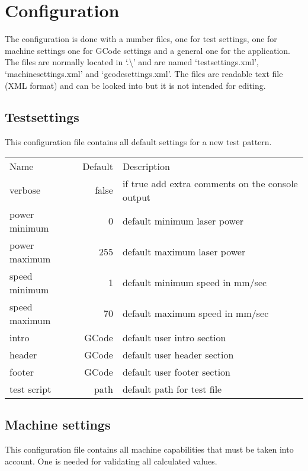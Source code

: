 \chapter{Configuration}\label{Configuration}

The configuration is done with a number files, one for test settings, one for machine settings
one for GCode settings and a general one for the application.
The files are normally located in `.\textbackslash' and are named
`testsettings.xml',
`machinesettings.xml' and
`gcodesettings.xml'.
The files are readable text file (XML format) and can be looked into but it is not intended for editing.

\section{Testsettings}
This configuration file contains all default settings for a new test pattern.

\begin{tabular}{lrl}
    Name    & Default   & Description\\
    verbose & false     & if true add extra comments on the console output\\
    power minimum &   0 & default minimum laser power\\
    power maximum & 255 & default maximum laser power\\
    speed minimum &   1 & default minimum speed in mm/sec\\
    speed maximum &  70 & default maximum speed in mm/sec\\
    intro   &     GCode & default user intro section\\
    header  &     GCode & default user header section\\
    footer  &     GCode & default user footer section\\
    test script &  path & default path for test file\\
\end{tabular}

\section{Machine settings}
This configuration file contains all machine capabilities that must be taken into account.
One is needed for validating all calculated values.

